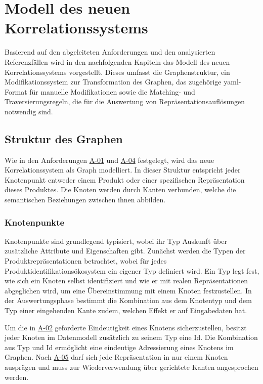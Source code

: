 \section{Modell des neuen Korrelationssystems}\label{sec:model-modellierungsansatz}

Basierend auf den abgeleiteten Anforderungen und den analysierten Referenzfällen wird in den nachfolgenden Kapiteln das Modell des neuen Korrelationssystems vorgestellt.
Dieses umfasst die Graphenstruktur, ein Modifikationssystem zur Transformation des Graphen, das zugehörige \acrshort{yaml}-Format für manuelle Modifikationen sowie die Matching- und Traversierungsregeln, die für die Auswertung von Repräsentationsauflösungen notwendig sind.

\subsection{Struktur des Graphen}\label{subsec:model-graph-struktur}

Wie in den Anforderungen \hyperref[subsec:req-format-product-graph]{A-01} und \hyperref[subsec:req-product-concept]{A-04} festgelegt, wird das neue Korrelationssystem als Graph modelliert.
In dieser Struktur entspricht jeder Knotenpunkt entweder einem Produkt oder einer spezifischen Repräsentation dieses Produktes.
Die Knoten werden durch Kanten verbunden, welche die semantischen Beziehungen zwischen ihnen abbilden.

\subsubsection{Knotenpunkte}\label{subsubsec:model-graph-knoten}

Knotenpunkte sind grundlegend typisiert, wobei ihr Typ Auskunft über zusätzliche Attribute und Eigenschaften gibt.
Zunächst werden die Typen der Produktrepräsentationen betrachtet, wobei für jedes Produktidentifikationsökosystem ein eigener Typ definiert wird.
Ein Typ legt fest, wie sich ein Knoten selbst identifiziert und wie er mit realen Repräsentationen abgeglichen wird, um eine Übereinstimmung mit einem Knoten festzustellen.
In der Auswertungsphase bestimmt die Kombination aus dem Knotentyp und dem Typ einer eingehenden Kante zudem, welchen Effekt er auf Eingabedaten hat.

Um die in \hyperref[subsec:req-node-id-type]{A-02} geforderte Eindeutigkeit eines Knotens sicherzustellen, besitzt jeder Knoten im Datenmodell zusätzlich zu seinem Typ eine Id.
Die Kombination aus Typ und Id ermöglicht eine eindeutige Adressierung eines Knotens im Graphen.
Nach \hyperref[subsec:req-unique-product-representations]{A-05} darf sich jede Repräsentation in nur einem Knoten ausprägen und muss zur Wiederverwendung über gerichtete Kanten angesprochen werden.

